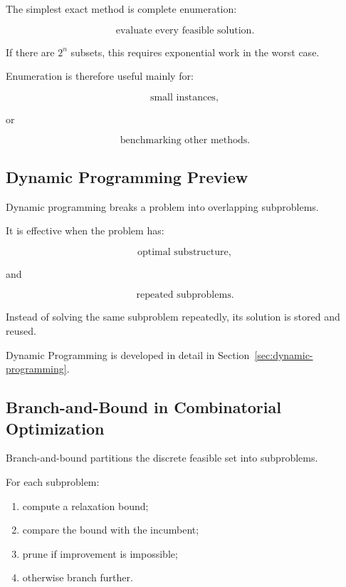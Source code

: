 The simplest exact method is complete enumeration:

\[
\boxed{
\text{evaluate every feasible solution}.
}
\]

If there are \(2^n\) subsets, this requires exponential work in the worst
case.

Enumeration is therefore useful mainly for:

\[
\boxed{
\text{small instances},
}
\]

or

\[
\boxed{
\text{benchmarking other methods}.
}
\]

\subsection{Dynamic Programming Preview}
\label{subsec:dynamic-programming-combinatorial-preview}

Dynamic programming breaks a problem into overlapping subproblems.

It is effective when the problem has:

\[
\boxed{
\text{optimal substructure},
}
\]

and

\[
\boxed{
\text{repeated subproblems}.
}
\]

Instead of solving the same subproblem repeatedly, its solution is stored
and reused.

Dynamic Programming is developed in detail in
Section~\ref{sec:dynamic-programming}.

\subsection{Branch-and-Bound in Combinatorial Optimization}
\label{subsec:branch-and-bound-combinatorial}

Branch-and-bound partitions the discrete feasible set into subproblems.

For each subproblem:

\begin{enumerate}
    \item compute a relaxation bound;
    \item compare the bound with the incumbent;
    \item prune if improvement is impossible;
    \item otherwise branch further.
\end{enumerate}

